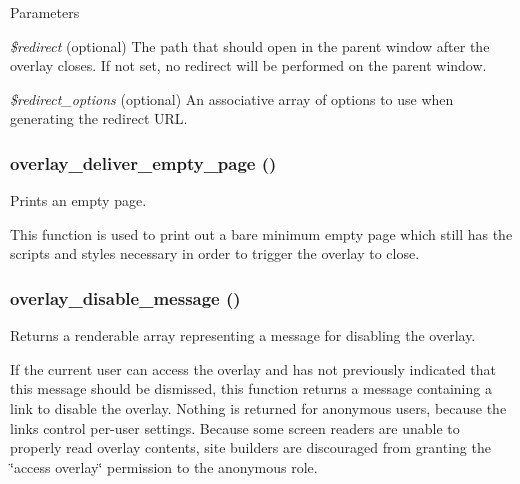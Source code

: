 \begin{DoxyParams}{Parameters}
\item[{\em \$redirect}](optional) The path that should open in the parent window after the overlay closes. If not set, no redirect will be performed on the parent window.\item[{\em \$redirect\_\-options}](optional) An associative array of options to use when generating the redirect URL. \end{DoxyParams}
\hypertarget{overlay_8module_ab3390e845af4437b752db858c494d9a7}{
\subsubsection[{overlay\_\-deliver\_\-empty\_\-page}]{\setlength{\rightskip}{0pt plus 5cm}overlay\_\-deliver\_\-empty\_\-page ()}}
\label{overlay_8module_ab3390e845af4437b752db858c494d9a7}
Prints an empty page.

This function is used to print out a bare minimum empty page which still has the scripts and styles necessary in order to trigger the overlay to close. \hypertarget{overlay_8module_af11fb3f5880badcf13c3254e755435a9}{
\subsubsection[{overlay\_\-disable\_\-message}]{\setlength{\rightskip}{0pt plus 5cm}overlay\_\-disable\_\-message ()}}
\label{overlay_8module_af11fb3f5880badcf13c3254e755435a9}
Returns a renderable array representing a message for disabling the overlay.

If the current user can access the overlay and has not previously indicated that this message should be dismissed, this function returns a message containing a link to disable the overlay. Nothing is returned for anonymous users, because the links control per-\/user settings. Because some screen readers are unable to properly read overlay contents, site builders are discouraged from granting the \char`\"{}access overlay\char`\"{} permission to the anonymous role.


